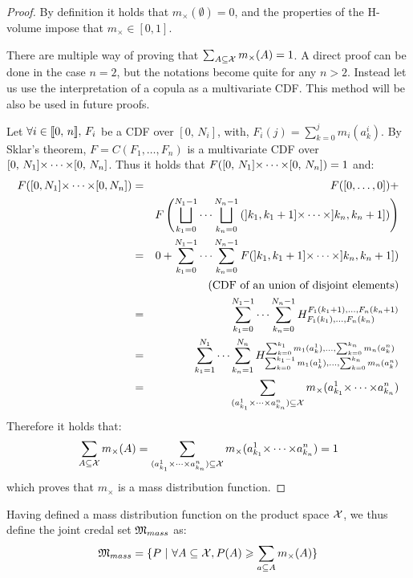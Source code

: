 \begin{proof}
    By definition it holds that $m_\times(\emptyset)=0$, and the properties of the H-volume impose that $m_\times\in[0,1]$.
    
    There are multiple way of proving that $\sum_{A\subseteq{\mathcal{X}}}m_\times(A)=1$. A direct proof can be done in the case $n=2$, but the notations become quite for any $n>2$. Instead let us use the interpretation of a copula as a multivariate CDF. This method will be also be used in future proofs.
    
    Let $\forall i\in{[\![} 0,\, n{]\!]},\, F_i$ be a CDF over $[0,\, N_i]$, with, $F_i(j)=\sum_{k=0}^j m_i(a_k^i)$. By Sklar's theorem, $F=C(F_1,\dots, F_n)$ is a multivariate CDF over $[0,\, N_1]{\times\dots\times}[0,\, N_n]$. Thus it holds that $F([0,\, N_1]{\times\dots\times}[0,\, N_n])=1$ and:
    \begin{eqnarray*}
        F([0, N_1]{\times\dots\times}[0, N_n]) &=& F([0,\dots,0])+\\
        &&F\left(\bigsqcup_{k_1=0}^{N_1-1}\dots\bigsqcup_{k_n=0}^{N_n-1}\left(]k_1, k_1+1]{\times\dots\times}]k_n, k_n+1]\right)\right)\\
        &=& 0 + \sum_{k_1=0}^{N_1-1}\dots\sum_{k_n=0}^{N_n-1} F(]k_1, k_1+1]{\times\dots\times}]k_n, k_n+1])\\
        && \text{(CDF of an union of disjoint elements)}\\
        &=& \sum_{k_1=0}^{N_1-1}\dots\sum_{k_n=0}^{N_n-1} H_{F_1(k_1), \dots, F_n(k_n)}^{F_1(k_1+1), \dots, F_n(k_n+1)}\\
        &=& \sum_{k_1=1}^{N_1}\dots\sum_{k_n=1}^{N_n} H_{\sum_{k=0}^{k_1-1}m_1(a^1_k), \dots, \sum_{k=0}^{k_n}m_n(a^n_k)}^{\sum_{k=0}^{k_1}m_1(a^1_k), \dots, \sum_{k=0}^{k_n}m_n(a^n_k)}\\
        &=& \sum_{(a^1_{k_1}{\times\dots\times} a^n_{k_n})\subseteq{\mathcal{X}}}m_\times(a^1_{k_1}{\times\dots\times} a^n_{k_n})
    \end{eqnarray*}
Therefore it holds that:
\begin{eqnarray}
    \sum_{A\subseteq{\mathcal{X}}}m_\times(A)=\sum_{(a^1_{k_1}{\times\dots\times} a^n_{k_n})\subseteq{\mathcal{X}}}m_\times(a^1_{k_1}{\times\dots\times} a^n_{k_n})=1
\end{eqnarray}
which proves that $m_\times$ is a mass distribution function.
\end{proof}

Having defined a mass distribution function on the product space ${\mathcal{X}}$, we thus define the joint credal set ${\mathfrak{M}}_{mass}$ as: 
\begin{eqnarray}\label{eq:credal_set_mass}
    {\mathfrak{M}}_{mass} = \{P~|~\forall A\subseteq{\mathcal{X}}, P(A)\geqslant \sum_{a\subseteq A}m_\times(A)\}
\end{eqnarray}

